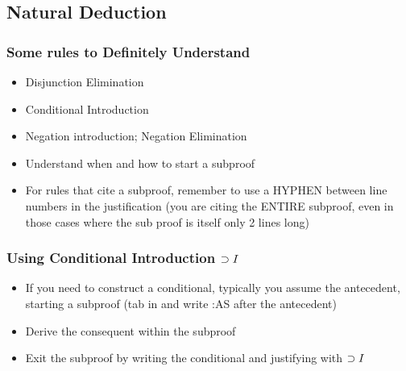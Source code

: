 \subsection{Natural Deduction}

\begin{frame}
\frametitle{Some rules to Definitely Understand}

\begin{itemize}[<+->]

\item Disjunction Elimination

\item Conditional Introduction

\item Negation introduction; Negation Elimination

\item Understand when and how to start a subproof

\item For rules that cite a subproof, remember to use a HYPHEN between line numbers in the justification (you are citing the ENTIRE subproof, even in those cases where the sub proof is itself only 2 lines long)

\end{itemize}
\end{frame}

\begin{frame}
\frametitle{Using Conditional Introduction $\supset I$}

\begin{itemize}[<+->]

\item If you need to construct a conditional, typically you assume the antecedent, starting a subproof (tab in and write :AS after the antecedent)

\item Derive the consequent within the subproof

\item Exit the subproof by writing the conditional and justifying with $\supset I$


\end{itemize}
\end{frame}

